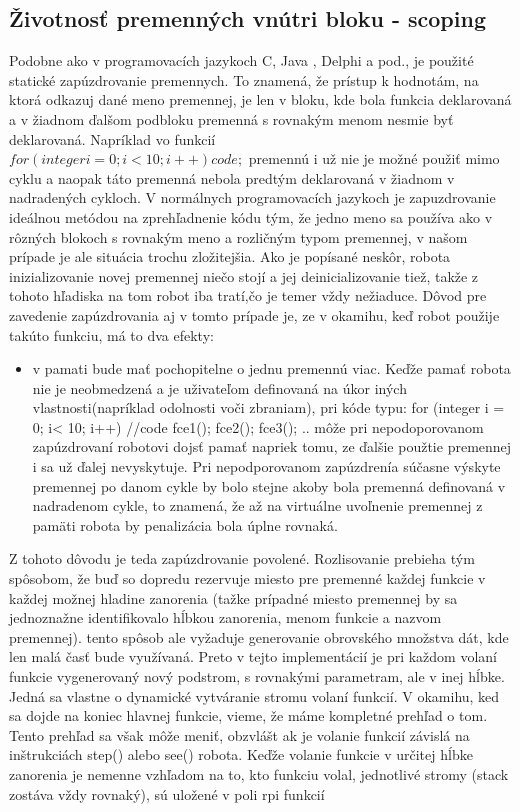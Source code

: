 \subsection{Životnosť premenných vnútri bloku - scoping}
\indent Podobne ako v programovacích jazykoch C, Java , Delphi a pod., je použité statické zapúzdrovanie premennych. To znamená, že prístup k hodnotám, na ktorá odkazuj dané meno premennej, je len v bloku, kde bola funkcia deklarovaná a v žiadnom ďalšom podbloku premenná s rovnakým menom nesmie byť deklarovaná. Napríklad vo funkcií \\
$for (integer i = 0; i<10; i++)
{
	code;
}$
premennú i už nie je možné použiť mimo cyklu a naopak táto premenná nebola predtým deklarovaná v žiadnom v nadradených cykloch. V normálnych programovacích jazykoch je zapuzdrovanie ideálnou metódou na zprehľadnenie kódu tým, že jedno meno sa používa ako v rôzných blokoch s rovnakým meno a rozličným typom premennej, v našom prípade je ale situácia trochu zložitejšia. Ako je popísané neskôr, robota inizializovanie novej premennej niečo stojí a jej deinicializovanie tiež, takže z tohoto hľadiska na tom robot iba tratí,čo je temer vždy nežiaduce. Dôvod pre zavedenie zapúzdrovania aj v tomto prípade je, ze v okamihu, keď robot použije takúto funkciu, má to dva efekty: \\
		\begin{itemize}
		\item v pamati bude mať pochopitelne o jednu premennú viac. Keďže pamať robota nie je neobmedzená a je uživateľom definovaná na úkor iných vlastnosti(napríklad odolnosti voči zbraniam), pri kóde typu:
for (integer i = 0; i< 10; i++)
{
	//code
}
fce1();
fce2();
fce3();
..
môže pri nepodoporovanom zapúzdrovaní robotovi dojsť pamať napriek tomu, ze ďalšie použtie premennej i sa už ďalej nevyskytuje. Pri nepodporovanom zapúzdrenía súčasne výskyte premennej po danom cykle by bolo stejne akoby bola premenná definovaná v nadradenom cykle, to znamená, že až na virtuálne uvoľnenie premennej z pamäti robota by penalizácia bola úplne rovnaká.
\end{itemize}
Z tohoto dôvodu je teda zapúzdrovanie povolené. Rozlisovanie prebieha tým spôsobom, že buď so dopredu rezervuje miesto pre premenné každej funkcie v každej možnej hladine zanorenia (tažke prípadné miesto premennej by sa jednoznažne identifikovalo hĺbkou zanorenia, menom funkcie a nazvom premennej). tento spôsob ale vyžaduje generovanie obrovského množstva dát, kde len malá časť bude využívaná. Preto v tejto implementácií je pri každom volaní funkcie vygenerovaný nový podstrom, s rovnakými parametram, ale v inej hĺbke. Jedná sa vlastne o dynamické vytváranie stromu volaní funkcií. V okamihu, ked sa dojde na koniec hlavnej funkcie, vieme, že máme kompletné prehľad o tom. Tento prehľad sa však môže meniť, obzvlášt ak je volanie funkcií závislá na inštrukciách step() alebo see() robota. Keďže volanie funkcie v určitej hĺbke zanorenia je nemenne vzhľadom na to, kto funkciu volal, jednotlivé stromy (stack zostáva vždy rovnaký), sú uložené v poli rpi funkcií
